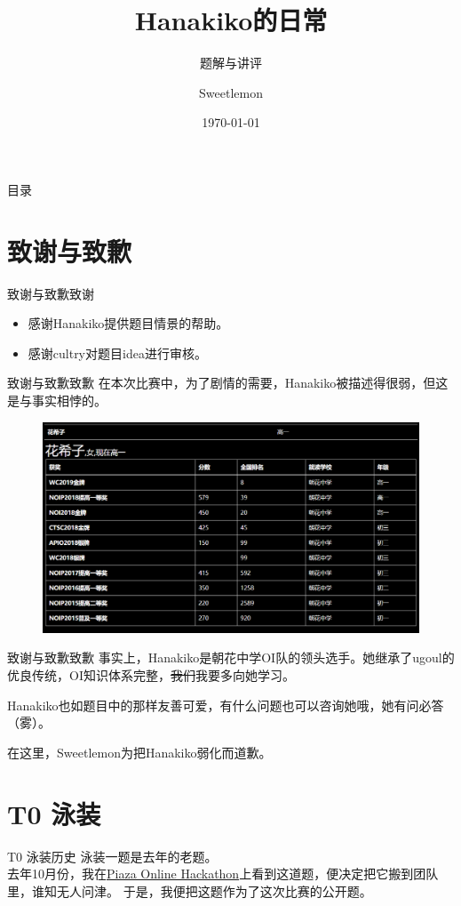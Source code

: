 \documentclass[utf8]{beamer}
\title{Hanakiko的日常}
\subtitle{题解与讲评}
\institute{南宁市第三中学}
\author{Sweetlemon}
\date{\today}
\begin{document}
\frame{\titlepage}


\begin{frame}{目录}
\tableofcontents
\end{frame}

\section{致谢与致歉}
\begin{frame}{致谢与致歉}{致谢}
    \begin{itemize}
        \item 感谢Hanakiko提供题目情景的帮助。
        \item 感谢\textcolor{admin}{cultry}对题目idea进行审核。
    \end{itemize}
\end{frame}
\begin{frame}{致谢与致歉}{致歉}
    在本次比赛中，为了剧情的需要，Hanakiko被描述得很弱，但这是与事实相悖的。
    \pause
    \begin{figure}
        \centering
        \includegraphics[width=\textwidth]{hanakiko_score.png}
    \end{figure}
\end{frame}
\begin{frame}{致谢与致歉}{致歉}
    事实上，Hanakiko是朝花中学OI队的领头选手。她继承了ugoul的优良传统，OI知识体系完整，\sout{我们}我要多向她学习。\newline 
 
    Hanakiko也如题目中的那样友善可爱，有什么问题也可以咨询她哦，她有问必答（雾）。\newline

    在这里，Sweetlemon为把Hanakiko弱化而道歉。
\end{frame}

\section{T0 泳装}
\begin{frame}{T0 泳装}{历史}
    泳装一题是去年的老题。\\
    去年10月份，我在\href{https://paiza.jp/poh/ando/challenge/f10d2975/ando13}{Piaza Online Hackathon}上看到这道题，便决定把它搬到团队里，谁知无人问津。
    于是，我便把这题作为了这次比赛的公开题。
\end{frame}
\end{document}
